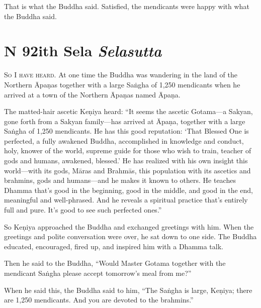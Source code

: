 \documentclass[12pt,openany]{book}%
\newcommand*{\suttatitleacronym}[1]{\smaller[2]{#1}\vspace*{.3em}}
\newcommand*{\suttatitletranslation}[1]{\linebreak{#1}}
\newcommand*{\suttatitleroot}[1]{\linebreak\smaller[2]\itshape{#1}}
\newcommand*{\tocacronym}[1]{\hspace*{-3.3em}{#1}\quad}
\newcommand*{\toctranslation}[1]{#1}
\newcommand*{\tocroot}[1]{(\textit{#1})}
\newcommand*{\scevam}[1]{\textsc{#1}}
\begin{document}
That is what the Buddha said. Satisfied, the mendicants were happy with what the Buddha said. 

%
\section*{{\suttatitleacronym MN 92}{\suttatitletranslation With Sela }{\suttatitleroot Selasutta}}
\addcontentsline{toc}{section}{\tocacronym{MN 92} \toctranslation{With Sela } \tocroot{Selasutta}}

\scevam{So I have heard. }At one time the Buddha was wandering in the land of the Northern \textsanskrit{Āpaṇas} together with a large \textsanskrit{Saṅgha} of 1,250 mendicants when he arrived at a town of the Northern \textsanskrit{Āpaṇas} named \textsanskrit{Āpaṇa}. 

The matted-hair ascetic \textsanskrit{Keṇiya} heard: “It seems the ascetic Gotama—a Sakyan, gone forth from a Sakyan family—has arrived at \textsanskrit{Āpaṇa}, together with a large \textsanskrit{Saṅgha} of 1,250 mendicants. He has this good reputation: ‘That Blessed One is perfected, a fully awakened Buddha, accomplished in knowledge and conduct, holy, knower of the world, supreme guide for those who wish to train, teacher of gods and humans, awakened, blessed.’ He has realized with his own insight this world—with its gods, \textsanskrit{Māras} and \textsanskrit{Brahmās}, this population with its ascetics and brahmins, gods and humans—and he makes it known to others. He teaches Dhamma that’s good in the beginning, good in the middle, and good in the end, meaningful and well-phrased. And he reveals a spiritual practice that’s entirely full and pure. It’s good to see such perfected ones.” 

So \textsanskrit{Keṇiya} approached the Buddha and exchanged greetings with him. When the greetings and polite conversation were over, he sat down to one side. The Buddha educated, encouraged, fired up, and inspired him with a Dhamma talk. 

Then he said to the Buddha, “Would Master Gotama together with the mendicant \textsanskrit{Saṅgha} please accept tomorrow’s meal from me?” 

When he said this, the Buddha said to him, “The \textsanskrit{Saṅgha} is large, \textsanskrit{Keṇiya}; there are 1,250 mendicants. And you are devoted to the brahmins.” 
\end{document}
